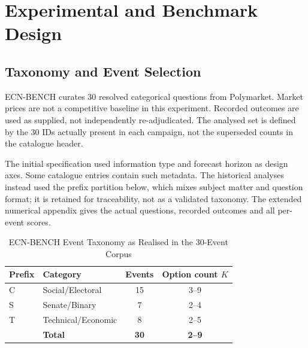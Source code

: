 \section{Experimental and Benchmark Design}
\label{sec:full_design}

\subsection{Taxonomy and Event Selection}
\label{sec:taxonomy}
ECN-BENCH curates 30 resolved categorical questions from Polymarket. Market prices are not a competitive baseline in this experiment. Recorded outcomes are used as supplied, not independently re-adjudicated. The analysed set is defined by the 30 IDs actually present in each campaign, not the superseded counts in the catalogue header.

The initial specification used information type and forecast horizon as design axes. Some catalogue entries contain such metadata. The historical analyses instead used the prefix partition below, which mixes subject matter and question format; it is retained for traceability, not as a validated taxonomy. The extended numerical appendix gives the actual questions, recorded outcomes and all per-event scores.

\begin{table}[!htbp]
\centering
\caption{ECN-BENCH Event Taxonomy as Realised in the 30-Event Corpus}
\begin{tabular}{llcc}
\toprule
\textbf{Prefix} & \textbf{Category} & \textbf{Events} & \textbf{Option count $K$} \\
\midrule
C & Social/Electoral   & 15 & 3--9 \\
S & Senate/Binary      &  7 & 2--4 \\
T & Technical/Economic &  8 & 2--5 \\
\midrule
  & \textbf{Total}     & \textbf{30} & \textbf{2--9} \\
\bottomrule
\end{tabular}
\label{tab:taxonomy}
\end{table}

